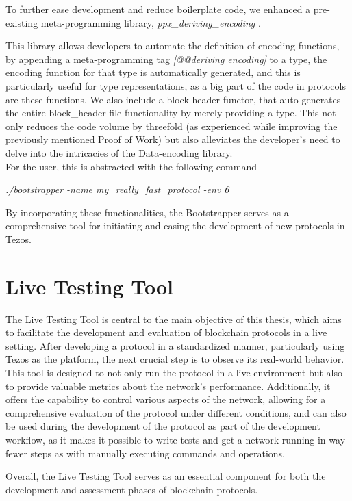 To further ease development and reduce boilerplate code, we enhanced a pre-existing meta-programming library, \textit{ppx\_deriving\_encoding} \cite{ppx_deriving_encoding}. 

This library allows developers to automate the definition of encoding functions, by appending a meta-programming tag \textit{[@@deriving encoding]} to a type, the encoding function for that type is automatically generated, and this is particularly useful for type representations, as a big part of the code in protocols are these functions.
We also include a block header functor, that auto-generates the entire block\_header file functionality by merely providing a type.
This not only reduces the code volume by threefold (as experienced while improving the previously mentioned Proof of Work) but also alleviates the developer's need to delve into the intricacies of the Data-encoding library.
\\
For the user, this is abstracted with the following command

\textit{./bootstrapper -name my\_really\_fast\_protocol -env 6}





By incorporating these functionalities, the Bootstrapper serves as a comprehensive tool for initiating and easing the development of new protocols in Tezos.


\section{Live Testing Tool}

The Live Testing Tool is central to the main objective of this thesis, which aims to facilitate the development and evaluation of blockchain protocols in a live setting. After developing a protocol in a standardized manner, particularly using Tezos as the platform, the next crucial step is to observe its real-world behavior. This tool is designed to not only run the protocol in a live environment but also to provide valuable metrics about the network's performance. Additionally, it offers the capability to control various aspects of the network, allowing for a comprehensive evaluation of the protocol under different conditions, and can also be used during the development of the protocol as part of the development workflow, as it makes it possible to write tests and get a network running in way fewer steps as with manually executing commands and operations.

Overall, the Live Testing Tool serves as an essential component for both the development and assessment phases of blockchain protocols.



